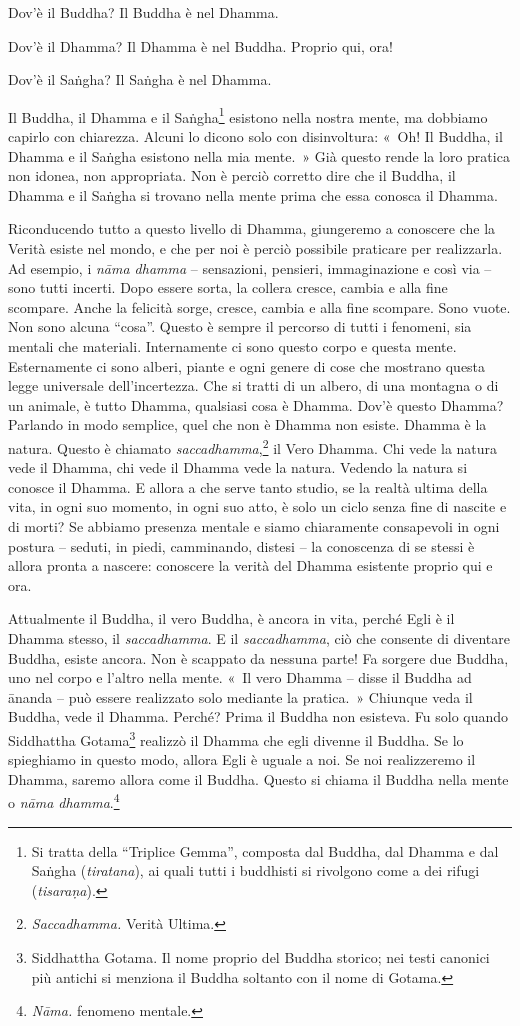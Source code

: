 Dov'è il Buddha? Il Buddha è nel Dhamma.

Dov'è il Dhamma? Il Dhamma è nel Buddha. Proprio qui, ora!

Dov'è il Saṅgha? Il Saṅgha è nel Dhamma.

Il Buddha, il Dhamma e il Saṅgha\footnote{Si tratta della ``Triplice
  Gemma'', composta dal Buddha, dal Dhamma e dal Saṅgha
  (\emph{tiratana}), ai quali tutti i buddhisti si rivolgono come a dei
  rifugi (\emph{tisaraṇa}).} esistono nella nostra mente, ma dobbiamo
capirlo con chiarezza. Alcuni lo dicono solo con disinvoltura: «~Oh! Il
Buddha, il Dhamma e il Saṅgha esistono nella mia mente.~» Già questo
rende la loro pratica non idonea, non appropriata. Non è perciò corretto
dire che il Buddha, il Dhamma e il Saṅgha si trovano nella mente prima
che essa conosca il Dhamma.

Riconducendo tutto a questo livello di Dhamma, giungeremo a conoscere
che la Verità esiste nel mondo, e che per noi è perciò possibile
praticare per realizzarla. Ad esempio, i \emph{nāma dhamma} --
sensazioni, pensieri, immaginazione e così via -- sono tutti incerti.
Dopo essere sorta, la collera cresce, cambia e alla fine scompare. Anche
la felicità sorge, cresce, cambia e alla fine scompare. Sono vuote. Non
sono alcuna ``cosa''. Questo è sempre il percorso di tutti i fenomeni,
sia mentali che materiali. Internamente ci sono questo corpo e questa
mente. Esternamente ci sono alberi, piante e ogni genere di cose che
mostrano questa legge universale dell'incertezza. Che si tratti di un
albero, di una montagna o di un animale, è tutto Dhamma, qualsiasi cosa
è Dhamma. Dov'è questo Dhamma? Parlando in modo semplice, quel che non è
Dhamma non esiste. Dhamma è la natura. Questo è chiamato
\emph{saccadhamma},\footnote{\emph{Saccadhamma.} Verità Ultima.}
il Vero Dhamma. Chi vede la natura vede il Dhamma, chi
vede il Dhamma vede la natura. Vedendo la natura si conosce il Dhamma. E
allora a che serve tanto studio, se la realtà ultima della vita, in ogni
suo momento, in ogni suo atto, è solo un ciclo senza fine di nascite e
di morti? Se abbiamo presenza mentale e siamo chiaramente consapevoli in
ogni postura -- seduti, in piedi, camminando, distesi -- la conoscenza
di se stessi è allora pronta a nascere: conoscere la verità del Dhamma
esistente proprio qui e ora.

Attualmente il Buddha, il vero Buddha, è ancora in vita, perché Egli è
il Dhamma stesso, il \emph{saccadhamma}. E il \emph{saccadhamma}, ciò
che consente di diventare Buddha, esiste ancora. Non è scappato da
nessuna parte! Fa sorgere due Buddha, uno nel corpo e l'altro nella
mente. «~Il vero Dhamma -- disse il Buddha ad ānanda -- può essere
realizzato solo mediante la pratica.~» Chiunque veda il Buddha, vede il
Dhamma. Perché? Prima il Buddha non esisteva. Fu solo quando Siddhattha
Gotama\footnote{Siddhattha Gotama. Il nome proprio del Buddha storico;
  nei testi canonici più antichi si menziona il Buddha soltanto con il
  nome di Gotama.} realizzò il Dhamma che egli divenne il Buddha. Se lo
spieghiamo in questo modo, allora Egli è uguale a noi. Se noi
realizzeremo il Dhamma, saremo allora come il Buddha. Questo si chiama
il Buddha nella mente o \emph{nāma dhamma}.\footnote{\emph{Nāma.}
  fenomeno mentale.}

